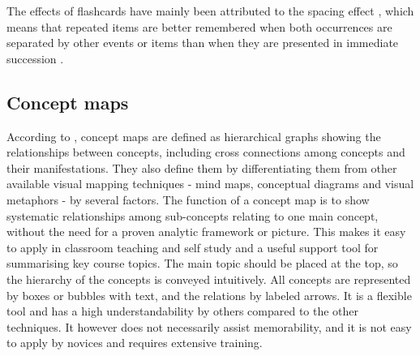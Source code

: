 \documentclass[11pt,twoside]{report} %
\begin{document}
The effects of flashcards have mainly been attributed to the spacing effect \cite{nakata, microlearning}, which means that repeated items are better remembered when both occurrences are separated by other events or items than when they are presented in immediate succession \cite{verkoeijen, logan, siegel, xue, karpicke2}.

\subsection{Concept maps}


According to , concept maps are defined as hierarchical graphs showing the relationships between concepts, including cross connections among concepts and their manifestations. They also define them by differentiating them from other available visual mapping techniques - mind maps, conceptual diagrams and visual metaphors - by several factors. The function of a concept map is to show systematic relationships among sub-concepts relating to one main concept, without the need for a proven analytic framework or picture. This makes it easy to apply in classroom teaching and self study and a useful support tool for summarising key course topics. The main topic should be placed at the top, so the hierarchy of the concepts is conveyed intuitively. All concepts are represented by boxes or bubbles with text, and the relations by labeled arrows. It is a flexible tool and has a high understandability by others compared to the other techniques. It however does not necessarily assist memorability, and it is not easy to apply by novices and requires extensive training.
\end{document}

